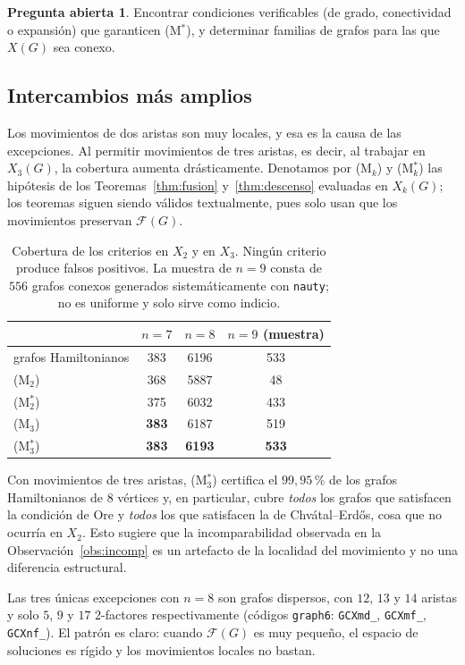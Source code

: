 \documentclass[11pt,a4paper]{article}
\theoremstyle{definition}
\newtheorem{pregunta}[teorema]{Pregunta abierta}
\theoremstyle{remark}
\begin{document}
\begin{pregunta}
Encontrar condiciones verificables (de grado, conectividad o expansión) que garanticen (M$^*$), y determinar familias de grafos para las que $X(G)$ sea conexo.
\end{pregunta}


\subsection{Intercambios más amplios}\label{sub:k3}

Los movimientos de dos aristas son muy locales, y esa es la causa de las excepciones. Al permitir movimientos de tres aristas, es decir, al trabajar en $X_3(G)$, la cobertura aumenta drásticamente. Denotamos por (M$_k$) y (M$^*_k$) las hipótesis de los Teoremas~\ref{thm:fusion} y~\ref{thm:descenso} evaluadas en $X_k(G)$; los teoremas siguen siendo válidos textualmente, pues solo usan que los movimientos preservan $\mathcal{F}(G)$.

\begin{table}[h]
\centering
\begin{tabular}{lccc}
\toprule
& $n=7$ & $n=8$ & $n=9$ (muestra)\\
\midrule
grafos Hamiltonianos & 383 & 6196 & 533\\
\midrule
(M$_2$) & 368 & 5887 & 48\\
(M$^*_2$) & 375 & 6032 & 433\\
(M$_3$) & \textbf{383} & 6187 & 519\\
(M$^*_3$) & \textbf{383} & \textbf{6193} & \textbf{533}\\
\bottomrule
\end{tabular}
\caption{Cobertura de los criterios en $X_2$ y en $X_3$. Ningún criterio produce falsos positivos. La muestra de $n=9$ consta de $556$ grafos conexos generados sistemáticamente con \texttt{nauty}; no es uniforme y solo sirve como indicio.}\label{tab:k3}
\end{table}

Con movimientos de tres aristas, (M$^*_3$) certifica el $99{,}95\,\%$ de los grafos Hamiltonianos de $8$ vértices y, en particular, cubre \emph{todos} los grafos que satisfacen la condición de Ore y \emph{todos} los que satisfacen la de Chvátal--Erdős, cosa que no ocurría en $X_2$. Esto sugiere que la incomparabilidad observada en la Observación~\ref{obs:incomp} es un artefacto de la localidad del movimiento y no una diferencia estructural.

Las tres únicas excepciones con $n=8$ son grafos dispersos, con $12$, $13$ y $14$ aristas y solo $5$, $9$ y $17$ 2-factores respectivamente (códigos \texttt{graph6}: \texttt{GCXmd\_}, \texttt{GCXmf\_}, \texttt{GCXnf\_}). El patrón es claro: cuando $\mathcal{F}(G)$ es muy pequeño, el espacio de soluciones es rígido y los movimientos locales no bastan.
\end{document}
